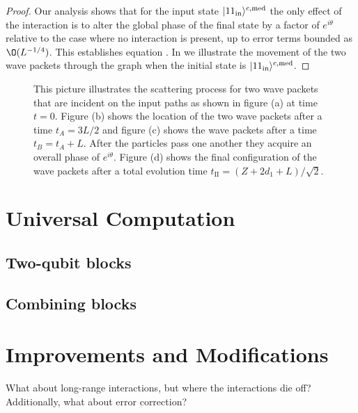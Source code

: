 \documentclass[../thesis-main/thesis-main]{subfiles}
\begin{document}
\begin{proof}
Our analysis shows that for the input state $|11_\text{in}\rangle^{c,\text{med}}$ the only effect of the interaction is to alter the global phase of the final state by a factor of $e^{i\theta}$ relative to the case where no interaction is present, up to error terms bounded as $\O(L^{-{1}/{4}})$. This establishes equation . In  we illustrate the movement of the two wave packets through the graph when the initial state is $|11_\text{in}\rangle^{c,\text{med}}$.

\end{proof}


\begin{figure}
  \centering
   
  \caption{This picture illustrates the scattering process for two wave packets that are incident on the input paths as shown in figure (a) at time $t=0$. Figure (b) shows the location of the two wave packets after a time $t_{A}={3L}/{2}$ and figure (c) shows the wave packets after a time $t_{B}=t_{A}+L$. After the particles pass one another they acquire an overall phase of $e^{i\theta}$. Figure (d) shows the final configuration of the wave packets after a total evolution time $t_{\mathrm{II}}={(Z+2d_{1}+L)}/{\sqrt{2}}$.}
  \label{fig:11_scattering_cartoon}
\end{figure}






\section{Universal Computation}
\subsection{Two-qubit blocks}
\subsection{Combining blocks}


\section{Improvements and Modifications}

What about long-range interactions, but where the interactions die off?
Additionally, what about error correction?

\biblio{}
\end{document}
